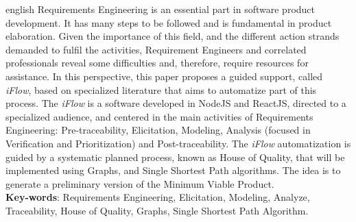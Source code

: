 \begin{resumo}[Abstract]
 \begin{otherlanguage*}{english}
    Requirements Engineering is an essential part in software product development. It has many steps to be followed and is fundamental in product elaboration. Given the importance of this field, and the different action strands demanded to fulfil the activities, Requirement Engineers and correlated professionals reveal some difficulties and, therefore, require resources for assistance. In this perspective, this paper proposes a guided support, called \textit{iFlow}, based on specialized literature that aims to automatize part of this process. The \textit{iFlow} is a software developed in NodeJS and ReactJS, directed to a specialized audience, and centered in the main activities of Requirements Engineering: Pre-traceability, Elicitation, Modeling, Analysis (focused in Verification and Prioritization) and Post-traceability. The \textit{iFlow} automatization is guided by a systematic planned process, known as House of Quality, that will be implemented using Graphs, and Single Shortest Path algorithms. The idea is to generate a preliminary version of the Minimum Viable Product.
   \vspace{\onelineskip}
   \noindent
   \\
   \textbf{Key-words}: Requirements Engineering, Elicitation, Modeling, Analyze, Traceability, House of Quality, Graphs, Single Shortest Path Algorithm.
 \end{otherlanguage*}
\end{resumo}
